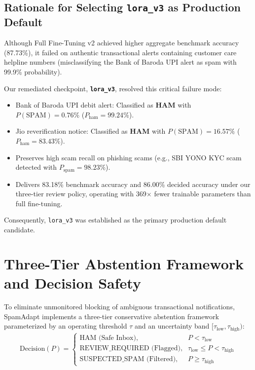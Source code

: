 \documentclass[conference]{IEEEtran}
\begin{document}
\subsection{Rationale for Selecting \texttt{lora\_v3} as Production Default}
Although Full Fine-Tuning v2 achieved higher aggregate benchmark accuracy (87.73\%), it failed on authentic transactional alerts containing customer care helpline numbers (misclassifying the Bank of Baroda UPI alert as spam with 99.9\% probability).

Our remediated checkpoint, \textbf{\texttt{lora\_v3}}, resolved this critical failure mode:
\begin{itemize}
    \item Bank of Baroda UPI debit alert: Classified as \textbf{HAM} with $P(\text{SPAM}) = 0.76\%$ ($P_{\text{ham}} = 99.24\%$).
    \item Jio reverification notice: Classified as \textbf{HAM} with $P(\text{SPAM}) = 16.57\%$ ($P_{\text{ham}} = 83.43\%$).
    \item Preserves high scam recall on phishing scams (e.g., SBI YONO KYC scam detected with $P_{\text{spam}} = 98.23\%$).
    \item Delivers 83.18\% benchmark accuracy and 86.00\% decided accuracy under our three-tier review policy, operating with 369$\times$ fewer trainable parameters than full fine-tuning.
\end{itemize}
Consequently, \texttt{lora\_v3} was established as the primary production default candidate.

\section{Three-Tier Abstention Framework and Decision Safety}
\label{sec:abstention}

To eliminate unmonitored blocking of ambiguous transactional notifications, SpamAdapt implements a three-tier conservative abstention framework parameterized by an operating threshold $\tau$ and an uncertainty band $[\tau_{\text{low}}, \tau_{\text{high}})$:
\begin{align}
    \text{Decision}(P) = 
    \begin{cases}
        \text{HAM (Safe Inbox)}, & P < \tau_{\text{low}} \\
        \text{REVIEW\_REQUIRED (Flagged)}, & \tau_{\text{low}} \le P < \tau_{\text{high}} \\
        \text{SUSPECTED\_SPAM (Filtered)}, & P \ge \tau_{\text{high}}
    \end{cases}
    \label{eq:abstention}
\end{align}
\end{document}

